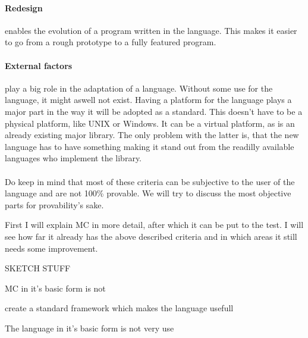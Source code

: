 \begin{multicols}{2}
\paragraph{Redesign}
enables the evolution of a program written in the language. This makes it easier to go from a rough prototype to a fully featured program.

\paragraph{External factors}
play a big role in the adaptation of a language. Without some use for the language, it might aswell not exist. Having a platform for the language plays a major part in the way it will be adopted as a standard. This doesn't have to be a physical platform, like UNIX or Windows. It can be a virtual platform, as is an already existing major library. The only problem with the latter is, that the new language has to have something making it stand out from the readilly available languages who implement the library.

\paragraph{}
Do keep in mind that most of these criteria can be subjective to the user of the language and are not 100\% provable. We will try to discuss the most objective parts for provability's sake.

First I will explain MC in more detail, after which it can be put to the test. I will see how far it already has the above described criteria and in which areas it still needs some improvement.

SKETCH STUFF

MC in it's basic form is not

create a standard framework which makes the language usefull

The language in it's basic form is not very use

\end{multicols}
